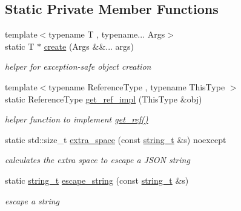 \subsection*{Static Private Member Functions}
\begin{DoxyCompactItemize}
\item 
\hypertarget{classnlohmann_1_1basic__json_afdb7a485369fbfd8c4c7c134ebb1feb5}{}\label{classnlohmann_1_1basic__json_afdb7a485369fbfd8c4c7c134ebb1feb5} 
{\footnotesize template$<$typename T , typename... Args$>$ }\\static T $\ast$ \hyperlink{classnlohmann_1_1basic__json_afdb7a485369fbfd8c4c7c134ebb1feb5}{create} (Args \&\&... args)
\begin{DoxyCompactList}\small\item\em helper for exception-\/safe object creation \end{DoxyCompactList}\item 
{\footnotesize template$<$typename Reference\+Type , typename This\+Type $>$ }\\static Reference\+Type \hyperlink{classnlohmann_1_1basic__json_a683cd53457a2a74dc82561e085381d8e}{get\+\_\+ref\+\_\+impl} (This\+Type \&obj)
\begin{DoxyCompactList}\small\item\em helper function to implement \hyperlink{classnlohmann_1_1basic__json_a4f332e90f3cae562d0c3fa6ba48f74f9}{get\+\_\+ref()} \end{DoxyCompactList}\item 
static std\+::size\+\_\+t \hyperlink{classnlohmann_1_1basic__json_a2dda20e69a1778aa8f69c08eb05db146}{extra\+\_\+space} (const \hyperlink{classnlohmann_1_1basic__json_ab63e618bbb0371042b1bec17f5891f42}{string\+\_\+t} \&s) noexcept
\begin{DoxyCompactList}\small\item\em calculates the extra space to escape a J\+S\+ON string \end{DoxyCompactList}\item 
static \hyperlink{classnlohmann_1_1basic__json_ab63e618bbb0371042b1bec17f5891f42}{string\+\_\+t} \hyperlink{classnlohmann_1_1basic__json_a287187938417b32a548e476058689d80}{escape\+\_\+string} (const \hyperlink{classnlohmann_1_1basic__json_ab63e618bbb0371042b1bec17f5891f42}{string\+\_\+t} \&s)
\begin{DoxyCompactList}\small\item\em escape a string \end{DoxyCompactList}\end{DoxyCompactItemize}

